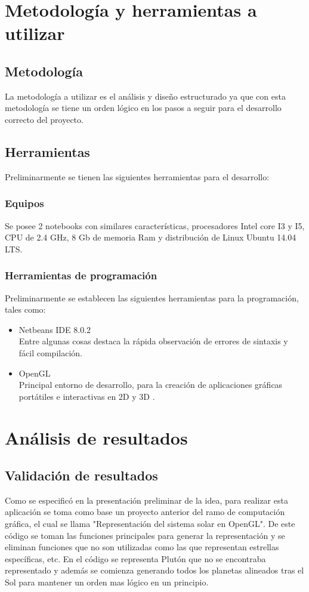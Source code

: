 \documentclass[12pt,journal,compsoc]{IEEEtran}
\begin{document}
\section{Metodología y herramientas a utilizar}
\subsection{Metodología}
La metodología a utilizar es el análisis y diseño estructurado ya que con esta metodología se tiene un orden lógico en los pasos a seguir para el desarrollo correcto del proyecto.
\subsection{Herramientas}
Preliminarmente se tienen las siguientes herramientas para el desarrollo:
\subsubsection{Equipos}
Se posee 2 notebooks con similares características, procesadores Intel core I3 y I5, CPU de 2.4 GHz, 8 Gb de memoria Ram y distribución de Linux Ubuntu 14.04 LTS.
\subsubsection{Herramientas de programación}
Preliminarmente se establecen las siguientes herramientas para la programación, tales como:
\begin{itemize}
 \item Netbeans IDE 8.0.2\\
 	Entre algunas cosas destaca la rápida observación de errores de sintaxis y fácil compilación.
 \item OpenGL\\
 	Principal entorno de desarrollo, para la creación de aplicaciones gráficas portátiles e interactivas en
 	2D y 3D \cite{opengl}.
\end{itemize}
\section{Análisis de resultados}
\subsection{Validación de resultados}
Como se especificó en  la presentación preliminar de la idea, para realizar esta aplicación se toma como base un proyecto anterior del ramo de computación gráfica, el cual se llama "Representación del sistema solar en OpenGL". De este código se toman las funciones principales para generar la representación y se eliminan funciones que no son utilizadas como las que representan estrellas específicas, etc. En el código se representa Plutón que no se encontraba representado y además se comienza generando todos los planetas alineados tras el Sol para mantener un orden mas lógico en un principio.
\end{document}
